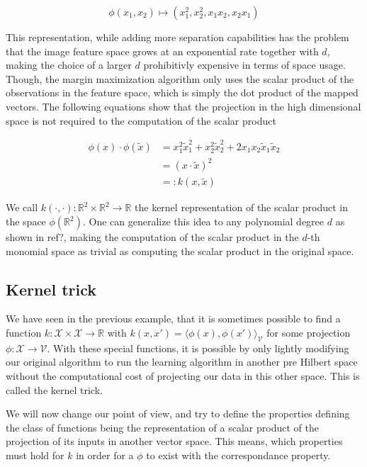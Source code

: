 \begin{equation*}
    \phi(x_1, x_2) \mapsto (x_1^2, x_2^2, x_1x_2, x_2x_1)
\end{equation*}

This representation, while adding more separation capabilities has the problem that the image feature space grows at an exponential rate together with $d$, making the choice of a larger $d$ prohibitivly expensive in terms of space usage. Though, the margin maximization algorithm only uses the scalar product of the observations in the feature space, which is simply the dot product of the mapped vectors. The following equations show that the projection in the high dimensional space is not required to the computation of the scalar product

\begin{equation*}
  \begin{aligned}
    \phi(x) \cdot \phi(\tilde{x})
    &= x_1^2\tilde{x}_1^2 + x_2^2\tilde{x}_2^2 + 2x_1x_2\tilde{x}_1\tilde{x}_2\\
    &= \left(x \cdot \tilde{x}\right)^2 \\
    &=: k(x, \tilde{x})
  \end{aligned}
\end{equation*}

We call $k(\cdot, \cdot) : \mathbb{R}^2 \times \mathbb{R}^2 \rightarrow \mathbb{R}$ the kernel representation of the scalar product in the space $\phi(\mathbb{R}^2)$. One can generalize this idea to any polynomial degree $d$ as shown in \textcolor[rgb]{1,0,0}{ref?}, making the computation of the scalar product in the $d$-th monomial space as trivial as computing the scalar product in the original space.

\subsection{Kernel trick}

We have seen in the previous example, that it is sometimes possible to find a function $k :\mathcal{X} \times \mathcal{X} \rightarrow \mathbb{R}$ with $k(x, x') = \langle \phi(x), \phi(x')\rangle _{\mathcal{V}}$ for some projection $\phi : \mathcal{X} \rightarrow \mathcal{V}$. With these special functions, it is possible by only lightly modifying our original algorithm to run the learning algorithm in another pre Hilbert space without the computational cost of projecting our data in this other space. This is called the kernel trick.

We will now change our point of view, and try to define the properties defining the class of functions being the representation of a scalar product of the projection of its inputs in another vector space. This means, which properties must hold for $k$ in order for a $\phi$ to exist with the correspondance property.

